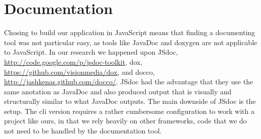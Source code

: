 \section{Documentation} %
\label{sec:Documentation}
Chosing to build our application in JavaScript means that finding a documenting tool was not particular easy, as tools like JavaDoc and doxygen are not applicable to JavaScript. In our research we happened upon JSdoc, \url{http://code.google.com/p/jsdoc-toolkit}, dox, \url{https://github.com/visionmedia/dox}, and docco, \url{http://jashkenas.github.com/docco/}. JSdoc had the advantage that they use the same anotation as JavaDoc and also produced output that is visually and structurally similar to what JavaDoc outputs. The main downside of JSdoc is the setup. The cli version requires a rather cumbersome configuration to work with a project like ours, in that we rely heavily on other frameworks, code that we do not need to be handled by the documentation tool.
